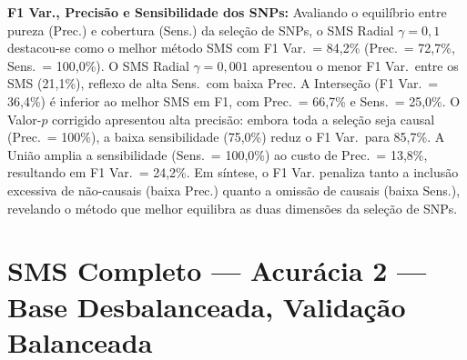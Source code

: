 \documentclass[
    12pt,
    a4paper,
    oneside,
    english,
    french,
    spanish,
    brazil
    ]{abntex2}
\newcommand{\novo}[1]{\textcolor{corNova}{#1}}
\begin{document}
\novo{\textbf{F1 Var., Precisão e Sensibilidade dos SNPs:} Avaliando o equilíbrio entre pureza (Prec.) e cobertura (Sens.) da seleção de SNPs, o SMS Radial $\gamma=0{,}1$ destacou-se como o melhor método SMS com F1 Var.\ = 84,2\% (Prec.\ = 72,7\%, Sens.\ = 100,0\%). O SMS Radial $\gamma=0{,}001$ apresentou o menor F1 Var.\ entre os SMS (21,1\%), reflexo de alta Sens.\ com baixa Prec. A Interseção (F1 Var.\ = 36,4\%) é inferior ao melhor SMS em F1, com Prec.\ = 66,7\% e Sens.\ = 25,0\%. O Valor-$p$ corrigido apresentou alta precisão: embora toda a seleção seja causal (Prec.\ = 100\%), a baixa sensibilidade (75,0\%) reduz o F1 Var.\ para 85,7\%. A União amplia a sensibilidade (Sens.\ = 100,0\%) ao custo de Prec.\ = 13,8\%, resultando em F1 Var.\ = 24,2\%. Em síntese, o F1 Var. penaliza tanto a inclusão excessiva de não-causais (baixa Prec.) quanto a omissão de causais (baixa Sens.), revelando o método que melhor equilibra as duas dimensões da seleção de SNPs.}
\section{SMS Completo --- Acurácia 2 --- Base Desbalanceada, Validação Balanceada}
\end{document}
